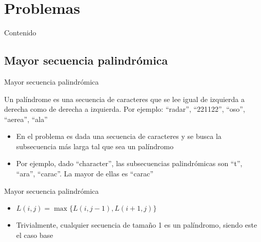 \documentclass[]{beamer}
\begin{document}
\section{Problemas}
\begin{frame}{Contenido}
\tableofcontents[currentsection]
\end{frame}

\subsection{Mayor secuencia palindr\'omica}
\begin{frame}{Mayor secuencia palindr\'omica}
  \begin{definition}
    Un pal\'indrome es una secuencia de caracteres que se lee igual de izquierda a derecha como de derecha a izquierda.
    Por ejemplo: ``radar'', ``221122'', ``oso'', ``aerea'', ``ala''
  \end{definition}
  \begin{itemize}
    \item En el problema es dada una secuencia de caracteres y se busca la subsecuencia m\'as larga tal que sea un pal\'indromo
      \pause
    \item Por ejemplo, dado ``character'', las subsecuencias palindr\'omicas son ``t'', ``ara'', ``carac''. La mayor de ellas es ``carac''
  \end{itemize}
\end{frame}

\begin{frame}{Mayor secuencia palindr\'omica}
  \pause
  \begin{itemize}
    \item $L(i,j) = \max \{L(i,j-1), L(i+1,j)\}$
      \pause
    \item Trivialmente, cualquier secuencia de tama\~no 1 es un pal\'indromo, siendo este el caso base
  \end{itemize}
\end{frame}
\end{document}
